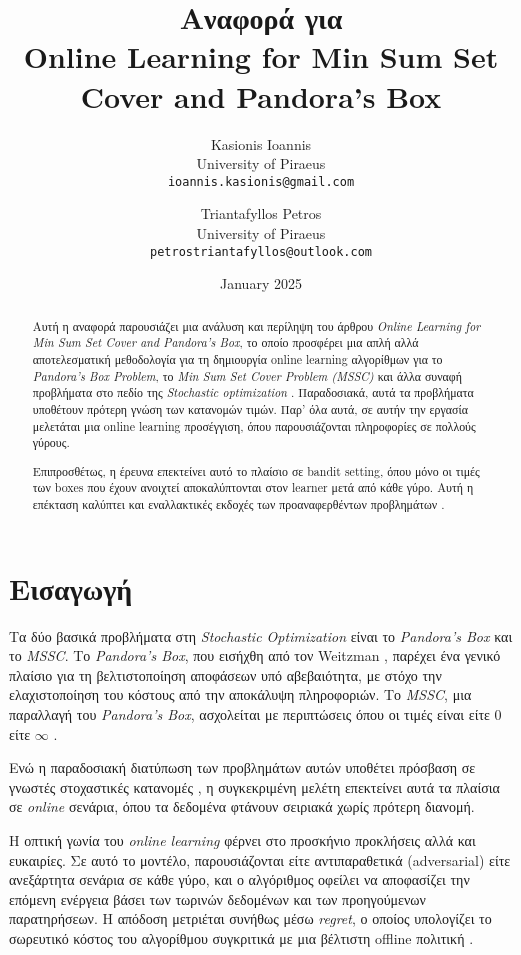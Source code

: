 \documentclass[11pt,a4paper]{article}
\title{Αναφορά για \\ \textbf{Online Learning for Min Sum Set Cover and Pandora's Box}}
\author{
    Kasionis Ioannis \\ University of Piraeus \\ \texttt{ioannis.kasionis@gmail.com}
    \and
    Triantafyllos Petros \\ University of Piraeus \\ \texttt{petrostriantafyllos@outlook.com}
}
\date{January 2025}
\begin{document}
\maketitle

\begin{abstract}
Αυτή η αναφορά παρουσιάζει μια ανάλυση και περίληψη του άρθρου \textit{Online Learning for Min Sum Set Cover and Pandora's Box}, το οποίο προσφέρει μια απλή αλλά αποτελεσματική μεθοδολογία για τη δημιουργία online learning αλγορίθμων για το \textit{Pandora's Box Problem}, το \textit{Min Sum Set Cover Problem (MSSC)} και άλλα συναφή προβλήματα στο πεδίο της \textit{Stochastic optimization} \cite{gergatsouli2022online}. Παραδοσιακά, αυτά τα προβλήματα υποθέτουν πρότερη γνώση των κατανομών τιμών. Παρ’ όλα αυτά, σε αυτήν την εργασία μελετάται μια online learning προσέγγιση, όπου παρουσιάζονται πληροφορίες σε πολλούς γύρους. \par

Επιπροσθέτως, η έρευνα επεκτείνει αυτό το πλαίσιο σε bandit setting, όπου μόνο οι τιμές των boxes που έχουν ανοιχτεί αποκαλύπτονται στον learner μετά από κάθε γύρο. Αυτή η επέκταση καλύπτει και εναλλακτικές εκδοχές των προαναφερθέντων προβλημάτων \cite{gergatsouli2022online}.
\end{abstract}

\section{Εισαγωγή}
Τα δύο βασικά προβλήματα στη \textit{Stochastic Optimization} είναι το \textit{Pandora's Box} και το \textit{MSSC}. 
Το \textit{Pandora's Box}, που εισήχθη από τον Weitzman \cite{weitzman1978optimal}, παρέχει ένα γενικό πλαίσιο για τη βελτιστοποίηση αποφάσεων υπό αβεβαιότητα, με στόχο την ελαχιστοποίηση του κόστους από την αποκάλυψη πληροφοριών. 
Το \textit{MSSC}, μια παραλλαγή του \textit{Pandora's Box}, ασχολείται με περιπτώσεις όπου οι τιμές είναι είτε $0$ είτε $\infty$ \cite{feige2004approximating}. \par

Ενώ η παραδοσιακή διατύπωση των προβλημάτων αυτών υποθέτει πρόσβαση σε γνωστές στοχαστικές κατανομές \cite{gergatsouli2022online}, η συγκεκριμένη μελέτη επεκτείνει αυτά τα πλαίσια σε \textit{online} σενάρια, όπου τα δεδομένα φτάνουν σειριακά χωρίς πρότερη διανομή. \par

Η οπτική γωνία του \textit{online learning} φέρνει στο προσκήνιο προκλήσεις αλλά και ευκαιρίες. Σε αυτό το μοντέλο, παρουσιάζονται είτε αντιπαραθετικά (adversarial) είτε ανεξάρτητα σενάρια σε κάθε γύρο, και ο αλγόριθμος οφείλει να αποφασίζει την επόμενη ενέργεια βάσει των τωρινών δεδομένων και των προηγούμενων παρατηρήσεων. Η απόδοση μετριέται συνήθως μέσω \textit{regret}, ο οποίος υπολογίζει το σωρευτικό κόστος του αλγορίθμου συγκριτικά με μια βέλτιστη offline πολιτική \cite{shalev2012online}.
\newline
\end{document}
